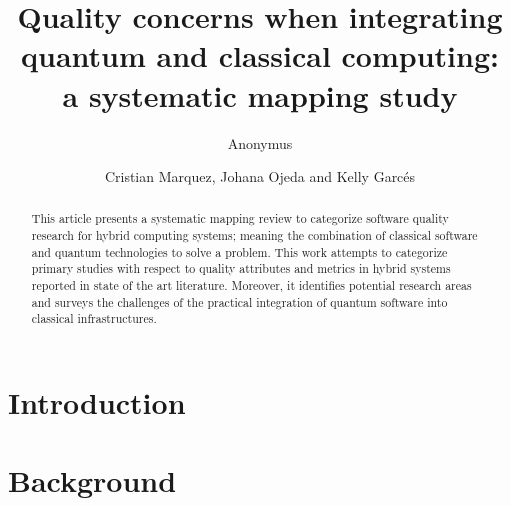 \documentclass[12pt]{article}
\title{Quality concerns when integrating quantum and classical computing: a systematic mapping study}
\author{Anonymus\inst{1}}
\author{Cristian Marquez\inst{1}, Johana Ojeda\inst{1} and Kelly Garcés \inst{1} }
\begin{document}
\maketitle

\begin{abstract}
This article presents a systematic mapping review to categorize software quality research for hybrid computing systems; meaning the combination of classical software and quantum technologies to solve a problem. This work attempts to categorize primary studies with respect to quality attributes and metrics in hybrid systems reported in state of the art literature. Moreover, it identifies potential research areas and surveys the challenges of the practical integration of quantum software into classical infrastructures.
\end{abstract}


\section{Introduction}


\section{Background}
\label{sec:background}


% 

% 

% 

% 



\end{document}
